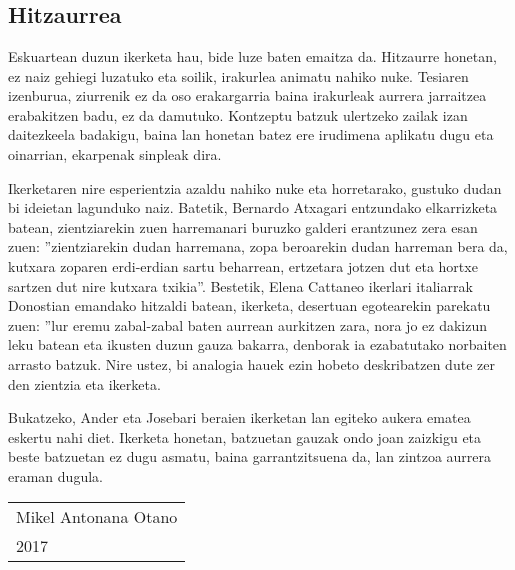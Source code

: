 \documentclass[12pt,a4paper]{basque-book}
\renewcommand{\=}{"-}
\begin{document}



\chapter*{}

\section*{Hitzaurrea}


Eskuartean duzun ikerketa hau, bide luze baten emaitza da. Hitzaurre honetan, ez naiz gehiegi luzatuko eta soilik, irakurlea animatu nahiko nuke. Tesiaren izenburua, ziurrenik ez da oso erakargarria baina irakurleak aurrera jarraitzea erabakitzen badu, ez da damutuko. 
Kontzeptu batzuk ulertzeko zailak izan daitezkeela badakigu, baina lan honetan batez ere irudimena aplikatu dugu eta oinarrian, ekarpenak sinpleak dira.

Ikerketaren nire esperientzia azaldu nahiko nuke eta horretarako, gustuko dudan bi ideietan lagunduko naiz. Batetik, Bernardo Atxagari entzundako elkarrizketa batean, zientziarekin zuen harremanari buruzko galderi erantzunez zera esan zuen: ''zientziarekin dudan harremana, zopa beroarekin dudan harreman bera da, kutxara zoparen erdi-erdian sartu beharrean, ertzetara jotzen dut eta hortxe sartzen dut nire kutxara txikia''. Bestetik, Elena Cattaneo ikerlari italiarrak Donostian emandako hitzaldi batean, ikerketa, desertuan egotearekin parekatu zuen: ''lur eremu zabal-zabal baten aurrean aurkitzen zara, nora jo  ez dakizun leku batean eta ikusten duzun gauza bakarra, denborak ia ezabatutako norbaiten arrasto  batzuk. Nire ustez, bi analogia hauek ezin hobeto deskribatzen dute zer den zientzia eta ikerketa.

Bukatzeko, Ander eta Josebari beraien ikerketan lan egiteko aukera ematea eskertu nahi diet. Ikerketa honetan, batzuetan gauzak ondo joan zaizkigu eta beste batzuetan ez dugu asmatu, baina garrantzitsuena da, lan zintzoa aurrera eraman dugula.
 
\vspace{20mm}

\begin{tabular}{l}
Mikel Antonana Otano\\
2017 
\end{tabular}


%

\end{document}
